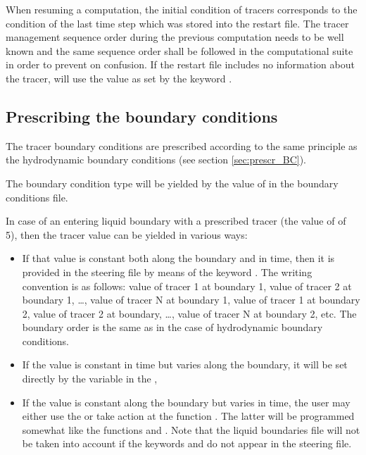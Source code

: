 When resuming a computation, the initial condition of tracers corresponds to
the condition of the last time step which was stored into the restart file.
The tracer management sequence order during the previous computation needs to
be well known and the same sequence order shall be followed in the
computational suite in order to prevent on confusion. If the restart file
includes no information about the tracer,  will use the value as set
by the keyword .


\subsection{Prescribing the boundary conditions}

The tracer boundary conditions are prescribed according to the same principle
as the hydrodynamic boundary conditions (see section \ref{sec:prescr_BC}).

The boundary condition type will be yielded by the value of  in
the boundary conditions file.

In case of an entering liquid boundary with a prescribed tracer (the value of
 of 5), then the tracer value can be yielded in various ways:

\begin{itemize}
\item  If that value is constant both along the boundary and in time, then it
is provided in the steering file by means of the keyword . The writing convention is as follows: value of tracer 1 at
boundary 1, value of tracer 2 at boundary 1, \dots , value of tracer N at
boundary 1, value of tracer 1 at boundary 2, value of tracer 2 at boundary,
\dots , value of tracer N at boundary 2, etc. The boundary order is the same as
in the case of hydrodynamic boundary conditions.

\item  If the value is constant in time but varies along the boundary, it will
be set directly by the  variable in the
,

\item  If the value is constant along the boundary but varies in time, the user
may either use the  or take action at the
function . The latter will be programmed somewhat like the functions
 and .
Note that the liquid boundaries file will not be taken into account
if the keywords  and  do not appear in the steering file.
\end{itemize}

